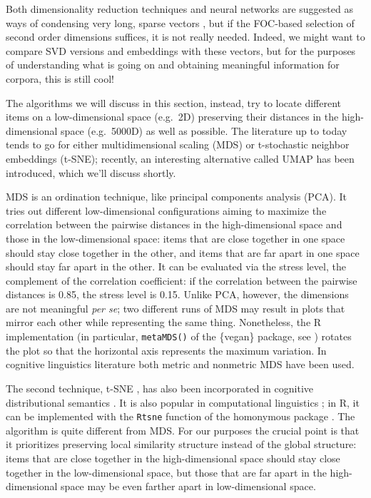 \documentclass[
]{book}
\begin{document}
Both dimensionality reduction techniques and neural networks are suggested as ways of condensing very long, sparse vectors \autocite{jurafsky.martin_2020,bolognesi_2020},
but if the FOC-based selection of second order dimensions suffices, it is not really needed. Indeed, we might want to compare SVD versions and embeddings with these vectors, but for the purposes of understanding what is going on and obtaining meaningful information for corpora, this is still cool!

The algorithms we will discuss in this section, instead, try to locate different items on a low-dimensional space (e.g.~2D) preserving their distances in the high-dimensional space (e.g.~5000D) as well as possible.
The literature up to today tends to go for either multidimensional scaling (MDS) or t-stochastic neighbor embeddings (t-SNE);
recently, an interesting alternative called UMAP has been introduced, which we'll discuss shortly.

MDS is an ordination technique, like principal components analysis (PCA). It tries out different low-dimensional configurations aiming to maximize the correlation between the pairwise distances in the high-dimensional space and those in the low-dimensional space: items that are close together in one space should stay close together in the other, and items that are far apart in one space should stay far apart in the other.
It can be evaluated via the stress level, the complement of the correlation coefficient: if the correlation between the pairwise distances is 0.85, the stress level is 0.15.
Unlike PCA, however, the dimensions are not meaningful \emph{per se}; two different runs of MDS may result in plots that mirror each other while representing the same thing. Nonetheless, the R implementation (in particular, \texttt{metaMDS()} of the \{vegan\} package, see \textcite{R-vegan}) rotates the plot so that the horizontal axis represents the maximum variation.
In cognitive linguistics literature both metric \autocite{hilpert.correiasaavedra_2017,hilpert.flach_2020,koptjevskaja-tamm.sahlgren_2014}
and nonmetric MDS \autocite{heylen.etal_2015,heylen.etal_2012,depascale_2019,perek_2016} have been used.

The second technique, t-SNE \autocite{Rtsne2008,Rtsne2014}, has also been incorporated in cognitive distributional semantics \autocite{depascale_2019,perek_2018}.
It is also popular in computational linguistics \autocites[ 118]{smilkov.etal_2016,jurafsky.martin_2020}; in R, it can be implemented with the \texttt{Rtsne} function of the homonymous package \autocite{R-Rtsne}.
The algorithm is quite different from MDS. For our purposes the crucial point is that it prioritizes preserving local similarity structure instead of the global structure: items that are close together in the high-dimensional space should stay close together in the low-dimensional space, but those that are far apart in the high-dimensional space may be even farther apart in low-dimensional space.
\end{document}
